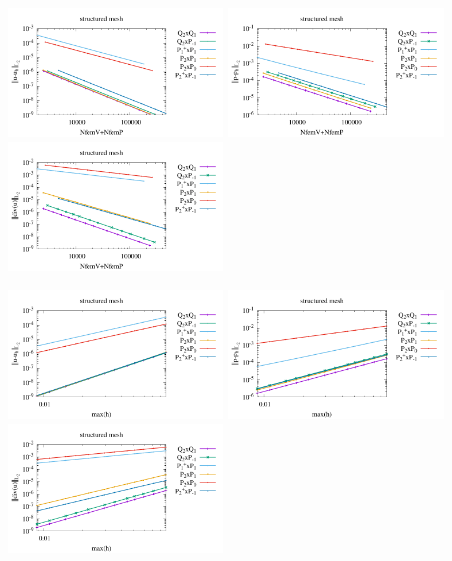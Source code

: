 \begin{center}
\includegraphics[width=5.7cm]{python_codes/fieldstone_120/paperresults/lire19_structured_errorsV2.pdf}
\includegraphics[width=5.7cm]{python_codes/fieldstone_120/paperresults/lire19_structured_errorsP2.pdf}
\includegraphics[width=5.7cm]{python_codes/fieldstone_120/paperresults/lire19_structured_errors_divv2.pdf}\\
\end{center}

\begin{center}
\includegraphics[width=5.7cm]{python_codes/fieldstone_120/paperresults/lire19_structured_errorsV3.pdf}
\includegraphics[width=5.7cm]{python_codes/fieldstone_120/paperresults/lire19_structured_errorsP3.pdf}
\includegraphics[width=5.7cm]{python_codes/fieldstone_120/paperresults/lire19_structured_errors_divv3.pdf}
\end{center}



